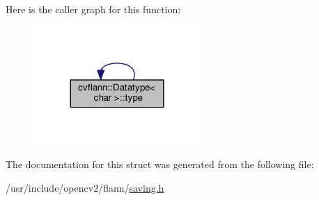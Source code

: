 Here is the caller graph for this function\-:\nopagebreak
\begin{figure}[H]
\begin{center}
\leavevmode
\includegraphics[width=180pt]{structcvflann_1_1Datatype_3_01char_01_4_aad018d98e50669fb991e6d4c11d91ff4_icgraph}
\end{center}
\end{figure}




The documentation for this struct was generated from the following file\-:\begin{DoxyCompactItemize}
\item 
/usr/include/opencv2/flann/\hyperlink{saving_8h}{saving.\-h}\end{DoxyCompactItemize}
